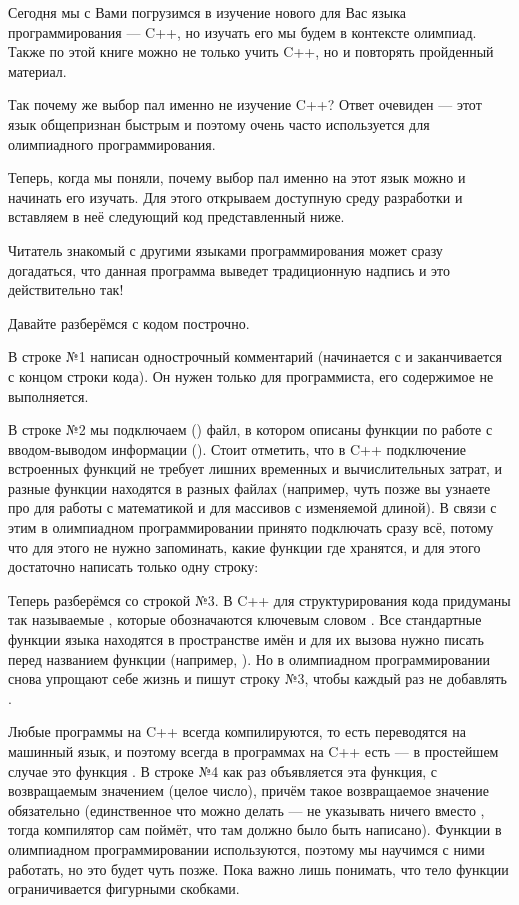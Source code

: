 \hypertarget{1.1}{}
Сегодня мы с Вами погрузимся в изучение нового для Вас языка программирования — C++, но изучать его мы будем в контексте олимпиад. Также по этой книге можно не только учить C++, но и повторять пройденный материал.

Так почему же выбор пал именно не изучение C++? Ответ очевиден — этот язык общепризнан быстрым и поэтому очень часто используется для олимпиадного программирования.

Теперь, когда мы поняли, почему выбор пал именно на этот язык можно и начинать его изучать. Для этого открываем доступную среду разработки и вставляем в неё следующий код представленный ниже.


Читатель знакомый с другими языками программирования может сразу догадаться, что данная программа выведет традиционную надпись  и это действительно так!

Давайте разберёмся с кодом построчно.

В строке №1 написан однострочный комментарий (начинается с \lcpp{//} и заканчивается с концом строки кода). Он нужен только для программиста, его содержимое не выполняется.

В строке №2 мы подключаем () файл, в котором описаны функции по работе с вводом-выводом информации (). Стоит отметить, что в C++ подключение встроенных функций не требует лишних временных и вычислительных затрат, и разные функции находятся в разных файлах (например, чуть позже вы узнаете про  для работы с математикой и  для массивов с изменяемой длиной). В связи с этим в олимпиадном программировании принято подключать сразу всё, потому что для этого не нужно запоминать, какие функции где хранятся, и для этого достаточно написать только одну строку:


Теперь разберёмся со строкой №3. В C++ для структурирования кода придуманы так называемые , которые обозначаются ключевым словом . Все стандартные функции языка находятся в пространстве имён  и для их вызова нужно писать  перед названием функции (например, ). Но в олимпиадном программировании снова упрощают себе жизнь и пишут строку №3, чтобы каждый раз не добавлять .

Любые программы на C++ всегда компилируются, то есть переводятся на машинный язык, и поэтому всегда в программах на C++ есть  —  в простейшем случае это функция . В строке №4 как раз объявляется эта функция, с возвращаемым значением  (целое число), причём такое возвращаемое значение обязательно (единственное что можно делать — не указывать ничего вместо , тогда компилятор сам поймёт, что там должно было быть написано). Функции в олимпиадном программировании используются, поэтому мы научимся с ними работать, но это будет чуть позже. Пока важно лишь понимать, что тело функции ограничивается фигурными скобками.

